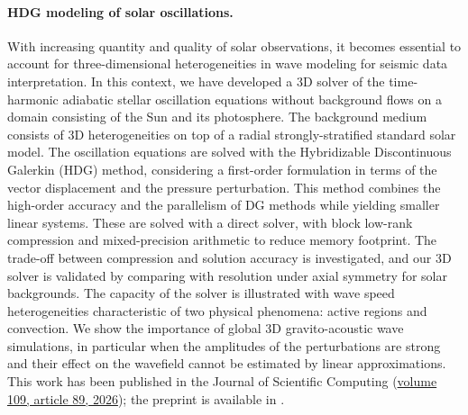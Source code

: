 \paragraph{HDG modeling of solar oscillations.}
With increasing quantity and quality of solar observations, it becomes essential to account for three-dimensional heterogeneities in wave modeling for seismic data interpretation. In this context, we have developed a 3D solver of the time-harmonic adiabatic stellar oscillation equations without background flows on a domain consisting of the Sun and its photosphere. The background medium consists of 3D heterogeneities on top of a radial strongly-stratified standard solar model. The oscillation equations are solved with the Hybridizable Discontinuous Galerkin (HDG) method, considering a first-order formulation in terms of the vector displacement and the pressure perturbation. This method combines the high-order accuracy and the parallelism of DG methods while yielding smaller linear systems. These are solved with a direct solver, with block low-rank compression and mixed-precision arithmetic to reduce memory footprint. The trade-off between compression and solution accuracy is investigated, and our 3D solver is validated by comparing with resolution under axial symmetry for solar backgrounds. The capacity of the solver is illustrated with wave speed heterogeneities characteristic of two physical phenomena: active regions and convection. We show
the importance of global 3D gravito-acoustic wave simulations, in particular when the amplitudes of the perturbations are strong and their effect on the wavefield cannot be estimated by linear approximations. This work has been published in the Journal of Scientific Computing
(\href{https://doi.org/10.1007/s10915-026-03489-0}{volume 109, article 89, 2026});
the preprint is available in \cite{hal_05393820}.

